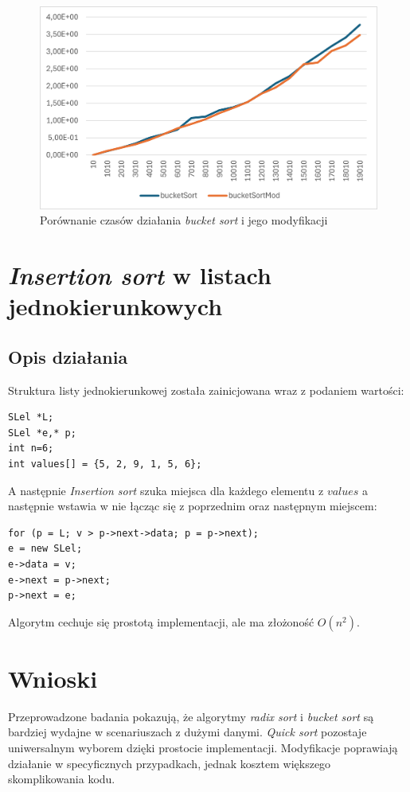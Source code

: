 \documentclass{article}
\begin{document}
	\begin{figure}[H]
		\centering
		\includegraphics[width=\textwidth]{bucket.png}
		\caption{Porównanie czasów działania \textit{bucket sort} i jego modyfikacji}
	\end{figure}
	
	\section{\textit{Insertion sort} w listach jednokierunkowych}
	
	\subsection{Opis działania}
	Struktura listy jednokierunkowej została zainicjowana wraz z podaniem wartości:
	\begin{lstlisting}
SLel *L;     
SLel *e,* p; 
int n=6;
int values[] = {5, 2, 9, 1, 5, 6}; 
	\end{lstlisting}
	A następnie \textit{Insertion sort} szuka miejsca dla każdego elementu z $values$ a następnie wstawia w nie łącząc się z poprzednim oraz następnym miejscem:
	\begin{lstlisting}
for (p = L; v > p->next->data; p = p->next);
e = new SLel;
e->data = v;
e->next = p->next;
p->next = e;
	\end{lstlisting}
	Algorytm cechuje się prostotą implementacji, ale ma złożoność $O(n^2)$.
	
	\section{Wnioski}
	Przeprowadzone badania pokazują, że algorytmy \textit{radix sort} i \textit{bucket sort} są bardziej wydajne w scenariuszach z dużymi danymi. \textit{Quick sort} pozostaje uniwersalnym wyborem dzięki prostocie implementacji. Modyfikacje poprawiają działanie w specyficznych przypadkach, jednak kosztem większego skomplikowania kodu.
	
\end{document}
